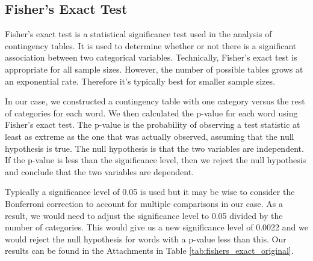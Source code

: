 \subsection{Fisher's Exact Test}

Fisher's exact test is a statistical significance test used in the analysis of contingency tables. It is used to determine whether or not there is a significant association between two categorical variables. Technically, Fisher's exact test is appropriate for all sample sizes. However, the number of possible tables grows at an exponential rate. Therefore it's typically best for smaller sample sizes.

In our case, we constructed a contingency table with one category versus the rest of categories for each word. We then calculated the p-value for each word using Fisher's exact test. The p-value is the probability of observing a test statistic at least as extreme as the one that was actually observed, assuming that the null hypothesis is true. The null hypothesis is that the two variables are independent. If the p-value is less than the significance level, then we reject the null hypothesis and conclude that the two variables are dependent. 

Typically a significance level of 0.05 is used but it may be wise to consider the Bonferroni correction to account for multiple comparisons in our case. As a result, we would need to adjust the significance level to 0.05 divided by the number of categories. This would give us a new significance level of 0.0022 and we would reject the null hypothesis for words with a p-value less than this. Our results can be found in the Attachments in Table \ref{tab:fishers_exact_original}.